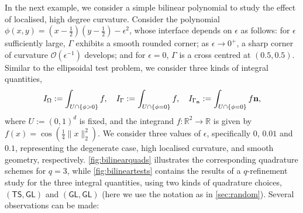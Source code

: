 \documentclass[onefignum,onetabnum,onealgnum,oneeqnum]{siamart190516}
\newcommand{\R}{\mathbb R}
\begin{document}
In the next example, we consider a simple bilinear polynomial to study the effect of localised, high degree curvature. Consider the polynomial $\phi(x,y) = (x-\tfrac12)(y-\tfrac12) - \epsilon^2$, whose interface depends on $\epsilon$ as follows: for $\epsilon$ sufficiently large, $\Gamma$ exhibits a smooth rounded corner; as $\epsilon \to 0^+$, a sharp corner of curvature ${\mathcal O}(\epsilon^{-1})$  develops; and for $\epsilon = 0$, $\Gamma$ is a cross centred at $(0.5,0.5)$. Similar to the ellipsoidal test problem, we consider three kinds of integral quantities,
\[ I_{\Omega} := \int_{U \cap \{\phi > 0\}} f, \quad I_{\Gamma} := \int_{U \cap \{\phi = 0\}} f, \quad I_{\Gamma_{\textbf n}} := \int_{U \cap \{\phi = 0\}} f \mathbf n, \]
where $U := (0,1)^d$ is fixed, and the integrand $f : \R^2 \to \R$ is given by $f(x) = \cos (\tfrac14 \|x\|_2^2)$. We consider three values of $\epsilon$, specifically $0$, $0.01$ and $0.1$, representing the degenerate case, high localised curvature, and smooth geometry, respectively. \cref{fig:bilinearquads} illustrates the corresponding quadrature schemes for $q = 3$, while \cref{fig:bilineartests} contains the results of a $q$-refinement study for the three integral quantities, using two kinds of quadrature choices, $(\mathsf{TS},\mathsf{GL})$ and $(\mathsf{GL},\mathsf{GL})$ (here we use the notation as in \cref{sec:random}). Several observations can be made:
\end{document}
